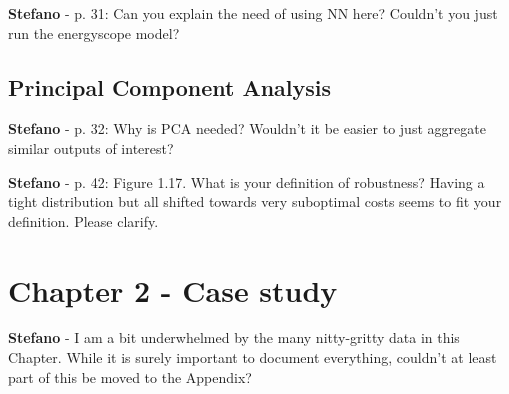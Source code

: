 \documentclass[12pt,a4paper]{article}
\begin{document}
\begin{mdframed}[style=comment] %
{\color{orange} \textbf{Stefano}} - p. 31: Can you explain the need of using NN here? Couldn’t you just run the energyscope model?
\end{mdframed}

\noindent 

\begin{mdframed}[style=manuscript] %

\end{mdframed}

\subsection{Principal Component Analysis}
\label{methodo_PCA}

\begin{mdframed}[style=comment] %
{\color{orange} \textbf{Stefano}} - p. 32: Why is PCA needed? Wouldn’t it be easier to just aggregate similar outputs of interest?
\end{mdframed}

\noindent 

\begin{mdframed}[style=manuscript] %

\end{mdframed}

\begin{mdframed}[style=comment] %
{\color{orange} \textbf{Stefano}} - p. 42: Figure 1.17. What is your definition of robustness? Having a tight distribution but all shifted towards very suboptimal costs seems to fit your definition. Please clarify.
\end{mdframed}

\noindent 

\begin{mdframed}[style=manuscript] %

\end{mdframed}

\section{Chapter 2 - Case study}
\label{methodo}


\begin{mdframed}[style=comment] %
{\color{orange} \textbf{Stefano}} - I am a bit underwhelmed by the many nitty-gritty data in this Chapter. While it is surely important to document everything, couldn’t at least part of this be moved to the Appendix?\end{mdframed}
\end{document}

